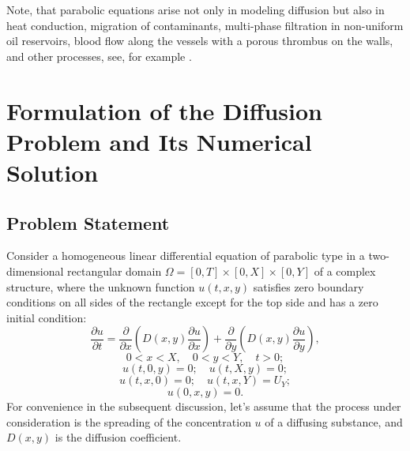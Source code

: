 \documentclass{ieeeaccess}
\begin{document}
Note, that parabolic equations arise not only in modeling diffusion but also in heat conduction, migration of contaminants, multi-phase filtration  in non-uniform oil reservoirs, blood flow along the vessels with a porous thrombus on the walls, and other processes, see, for example \cite{Chekalin_2017,  Konyukhov_2020, Konyukhov_2022, Konyukhov_2023, Konyukhov_2025, Barenblat}.


\section{Formulation of the Diffusion Problem and Its Numerical Solution}

\subsection{Problem Statement}

Consider a homogeneous linear differential equation of parabolic type in a two-dimensional rectangular domain $\Omega = [0,T] \times [0,X] \times [0,Y]$ of a complex structure, where the unknown function $u(t,x,y)$ satisfies zero boundary conditions on all sides of the rectangle except for the top side and has a zero initial condition:
%
\begin{equation}\label{eq:k15f}
    \frac{\partial u}{\partial t} = \frac{\partial}{\partial x}\left( D(x,y)\frac{\partial u}{\partial x} \right) + \frac{\partial}{\partial y}\left( D(x,y)\frac{\partial u}{\partial y} \right), 
\end{equation}
$$
0 < x < X, \quad 0 < y < Y, \quad t > 0;
$$
%
\begin{equation}\label{eq:k16f}
    u(t,0,y) = 0; \quad  u(t,X,y) = 0; 
\end{equation}
\begin{equation}\label{eq:k16f_2}
    u(t,x,0) = 0; \quad u(t,x,Y) = U_Y;
\end{equation}
%
\begin{equation}\label{eq:k17f}
    u(0, x, y) = 0.
\end{equation}
%
For convenience in the subsequent discussion, let's assume that the process under consideration is the spreading of the concentration $u$ of a diffusing substance, and $D(x,y)$ is the diffusion coefficient.
\end{document}
